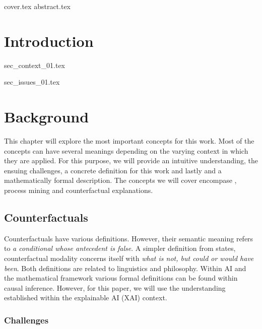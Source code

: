 \documentclass[12pt,a4paper]{report}
\begin{document}
{cover.tex}
{abstract.tex}


\tableofcontents
\printglossary[type=acronym, title=List of terms, toctitle=List of terms]


\chapter{Introduction}
\label{sec:intro}

{sec_context_01.tex}

{sec_issues_01.tex}

\chapter{Background}
\label{sec:prereq}
This chapter will explore the most important concepts for this work. Most of the concepts can have several meanings depending on the varying context in which they are applied. For this purpose, we will provide an intuitive understanding, the ensuing challenges, a concrete definition for this work and lastly and a mathematically formal description. The concepts we will cover encompase , process mining and counterfactual explanations.

\section{Counterfactuals}

Counterfactuals have various definitions. However, their semantic meaning refers to \emph{a conditional whose antecedent is false}\autocite{_Counterfactual_}. A simpler definition from \citeauthor{starr_Counterfactuals_2021} states, counterfactual modality concerns itself with \emph{what is not, but could or would have been}.
Both definitions are related to linguistics and philosophy. Within AI and the mathematical framework various formal definitions can be found within causal inference\autocite{hitchcock_CausalModels_2020}. However, for this paper, we will use the understanding established within the explainable AI (XAI) context.
\subsection{Challenges}
\end{document}
